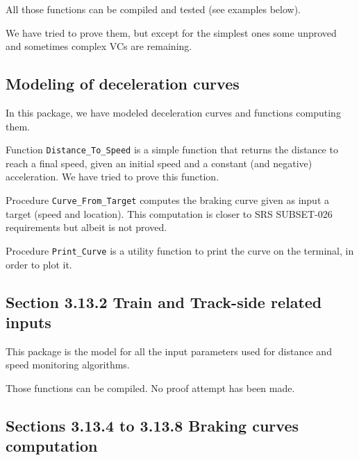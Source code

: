 \documentclass{template/openetcs_report}
\newcommand{\Ada}[1]{\lstinline[language=Ada,basicstyle={\sffamily},framesep=0pt]{#1}}
\begin{document}
All those functions can be compiled and tested (see examples below).

We have tried to prove them, but except for the simplest ones some
unproved and sometimes complex VCs are remaining.





\subsection{Modeling of deceleration curves}

In this package, we have modeled deceleration curves and functions
computing them.

Function \Ada{Distance_To_Speed} is a simple function that returns the
distance to reach a final speed, given an initial speed and a constant
(and negative) acceleration. We have tried to prove this function.

Procedure \Ada{Curve_From_Target} computes the braking curve given as
input a target (speed and location). This computation is closer to SRS
SUBSET-026 requirements but albeit is not proved.

Procedure \Ada{Print_Curve} is a utility function to print the curve
on the terminal, in order to plot it.





\subsection{Section 3.13.2 Train and Track-side related inputs}

This package is the model for all the input parameters used for
distance and speed monitoring algorithms.

Those functions can be compiled. No proof attempt has been made.




\subsection{Sections 3.13.4 to 3.13.8 Braking curves computation}
\end{document}
